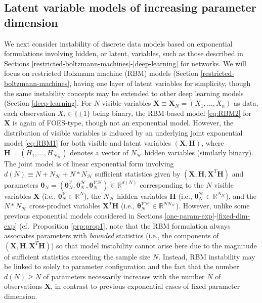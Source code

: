\documentclass[]{article}
\theoremstyle{definition}
\begin{document}
\subsection{Latent variable models of increasing parameter
dimension}\label{latent-variable-models-of-increasing-parameter-dimension}

We next consider instability of discrete data models based on
exponential formulations involving hidden, or latent, variables, such as
those described in Sections
\ref{restricted-boltzmann-machines}-\ref{deep-learning} for networks. We
will focus on restricted Bolzmann machine (RBM) models (Section
\ref{restricted-boltzmann-machines}, having one layer of latent
variables for simplicity, though the same instability concepts may be
extended to other deep learning models (Section \ref{deep-learning}. For
\(N\) visible variables
\(\boldsymbol X \equiv \boldsymbol X_N = (X_1,\ldots,X_n)\) as data,
each observation \(X_i\in\{\pm 1\}\) being binary, the RBM-based model
\eqref{eq:RBM2} for \(\boldsymbol X\) is again of FOES-type, though not an
exponential model. However, the distribution of visible variables is
induced by an underlying joint exponential model \eqref{eq:RBM1} for both
visible and latent variables \((\boldsymbol X, \boldsymbol H)\), where
\(\boldsymbol H=(H_1,\ldots,H_{N_{\mathcal{H}}})\) denotes a vector of
\(N_{\mathcal{H}}\) hidden variables (similarly binary). The joint model
is of linear exponential form involving
\(d(N)\equiv N + N_{\mathcal{H}} + N* N_{\mathcal{H}}\) sufficient
statistics given by
\((\boldsymbol X, \boldsymbol H, \boldsymbol X^T\boldsymbol H)\) and
parameters
\(\boldsymbol \theta_N = (\boldsymbol \theta_N^{\mathcal{V}},\boldsymbol \theta_N^{\mathcal{H}}, \boldsymbol \theta_N^{\mathcal{VH}} ) \in\mathbb{R}^{d(N)}\)
corresponding to the \(N\) visible variables \(\boldsymbol X\) (i.e.,
\(\boldsymbol \theta_N^{\mathcal{V}}\in\mathbb{R}^N\)), the
\(N_{\mathcal{H}}\) hidden variables \(\boldsymbol H\) (i.e.,
\(\boldsymbol \theta_N^{\mathcal{H}}\in\mathbb{R}^{N_{\mathcal{H}}}\)),
and the \(N *N_{\mathcal{H}}\) cross-product variables
\(\boldsymbol X^T\boldsymbol H\) (i.e.,
\(\boldsymbol \theta_N^{\mathcal{VH}}\in\mathbb{R}^{N N_{\mathcal{H}}}\)).
However, unlike some previous exponential models considered in Sections
\ref{one-param-exp}-\ref{fixed-dim-exp} (cf.~Proposition
\ref{prp:prop1}, note that the RBM formulation always associates
parameters with \emph{bounded} statistics (i.e., the components of
\((\boldsymbol X, \boldsymbol H, \boldsymbol X^T\boldsymbol H)\)) so
that model instability cannot arise here due to the magnitude of
sufficient statistics exceeding the sample size \(N\). Instead, RBM
instability may be linked to solely to parameter configuration and the
fact that the number \(d(N) \geq N\) of parameters necessarily increases
with the number \(N\) of observations \(\boldsymbol X\), in contrast to
previous exponential cases of fixed parameter dimension.
\end{document}
